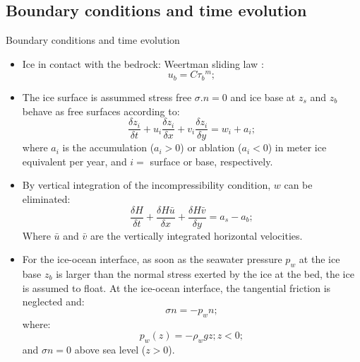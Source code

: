 \documentclass[11pt]{beamer}
\begin{document}
	\subsection{Boundary conditions and time evolution}
		\begin{frame}[allowframebreaks]{Boundary conditions and time evolution}
		\justifying
			\begin{itemize}
				\item Ice in contact with the bedrock: Weertman sliding law \cite[]{weertman1974stability}:
				\begin{equation}
					u_b=C{\tau_b}^m;
				\end{equation}
				\item The ice surface is assummed stress free $\sigma .n=0$ and ice base at $z_s$ and $z_b$ behave as free surfaces according to:
				\begin{equation}
					\frac{\delta z_{i}}{\delta t}+u_{i}\frac{\delta z_{i}}{\delta x}+v_{i}\frac{\delta z_{i}}{\delta y}=w_{i}+a_{i};
				\end{equation}
			where $a_{i}$ is the accumulation ($a_{i}>0$) or ablation ($a_{i}<0$) in meter ice equivalent per year, and $i=$ surface or base, respectively.
			\item By vertical integration of the incompressibility condition, $w$ can be eliminated:
			\begin{equation}
				\frac{\delta H}{\delta t}+\frac{\delta H\bar{u}}{\delta x}+\frac{\delta H \bar{v}}{\delta y}=a_s-a_b ;
			\end{equation}
			Where $\bar{u}$ and $\bar{v}$ are the vertically integrated horizontal velocities. 
			\item For the ice-ocean interface, as soon as the seawater pressure $p_w$ at the ice base $z_b$ is larger than the normal stress exerted by the ice at the bed, the ice is assumed to float. At the ice-ocean interface, the tangential friction is neglected and:
			\begin{equation}
				\sigma  n=-p_wn ;
			\end{equation}
			where:
			\begin{equation}
				p_w(z)=-\rho_wgz; z<0;
			\end{equation}
			and $\sigma n=0$ above sea level ($z>0$).
			\end{itemize}
		\end{frame}
\end{document}
